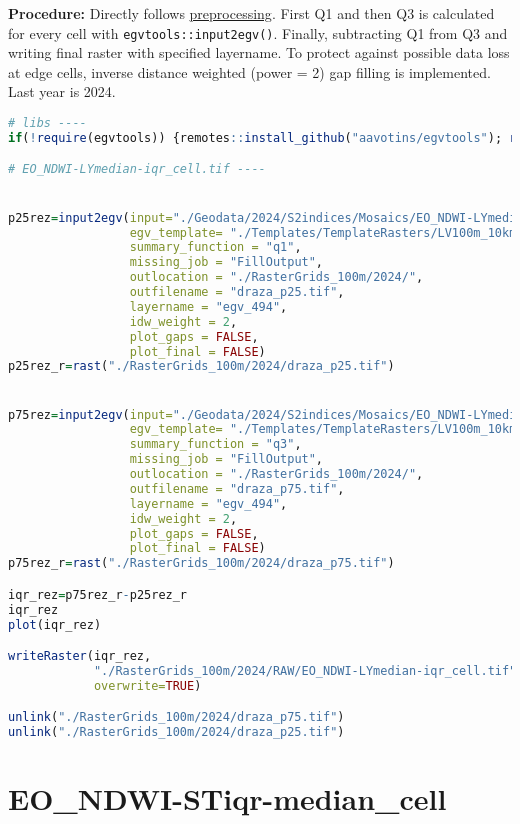 \documentclass[
]{book}
\newcommand{\passthrough}[1]{#1}
\begin{document}
\textbf{Procedure:} Directly follows \hyperref[Ch04.13]{preprocessing}. First Q1 and then Q3
is calculated for every cell with \passthrough{\lstinline!egvtools::input2egv()!}. Finally, subtracting
Q1 from Q3 and writing final raster with specified layername. To protect against possible data loss at edge cells,
inverse distance weighted (power = 2) gap filling is implemented. Last year is 2024.

\begin{lstlisting}[language=R]
# libs ----
if(!require(egvtools)) {remotes::install_github("aavotins/egvtools"); require(egvtools)}

# EO_NDWI-LYmedian-iqr_cell.tif ----


p25rez=input2egv(input="./Geodata/2024/S2indices/Mosaics/EO_NDWI-LYmedian.tif",
                 egv_template= "./Templates/TemplateRasters/LV100m_10km.tif",
                 summary_function = "q1",
                 missing_job = "FillOutput",
                 outlocation = "./RasterGrids_100m/2024/",
                 outfilename = "draza_p25.tif",
                 layername = "egv_494",
                 idw_weight = 2,
                 plot_gaps = FALSE,
                 plot_final = FALSE)
p25rez_r=rast("./RasterGrids_100m/2024/draza_p25.tif")


p75rez=input2egv(input="./Geodata/2024/S2indices/Mosaics/EO_NDWI-LYmedian.tif",
                 egv_template= "./Templates/TemplateRasters/LV100m_10km.tif",
                 summary_function = "q3",
                 missing_job = "FillOutput",
                 outlocation = "./RasterGrids_100m/2024/",
                 outfilename = "draza_p75.tif",
                 layername = "egv_494",
                 idw_weight = 2,
                 plot_gaps = FALSE,
                 plot_final = FALSE)
p75rez_r=rast("./RasterGrids_100m/2024/draza_p75.tif")

iqr_rez=p75rez_r-p25rez_r
iqr_rez
plot(iqr_rez)

writeRaster(iqr_rez,
            "./RasterGrids_100m/2024/RAW/EO_NDWI-LYmedian-iqr_cell.tif",
            overwrite=TRUE)

unlink("./RasterGrids_100m/2024/draza_p75.tif")
unlink("./RasterGrids_100m/2024/draza_p25.tif")
\end{lstlisting}

\section{EO\_NDWI-STiqr-median\_cell}\label{ch06.495}
\end{document}
